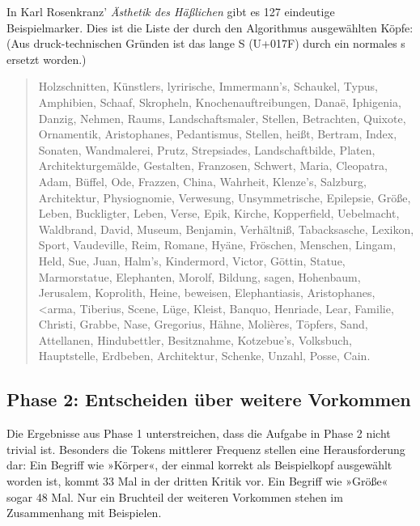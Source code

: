 \documentclass{article}
\newcommand*{\lit}{\textit}%
\begin{document}
In Karl Rosenkranz' \lit{Ästhetik des
  Häßlichen} \parencite{Rosenkranz1853a} gibt es 127 eindeutige
Beispielmarker. Dies ist die Liste der durch den Algorithmus
ausgewählten Köpfe: (Aus druck-technischen Gründen ist das lange S
(U+017F) durch ein normales s ersetzt worden.)

\begin{quote}
  Holzschnitten, Künstlers, lyrirische, Immermann's, Schaukel, Typus,
  Amphibien, Schaaf, Skropheln, Knochenauftreibungen, Danaë,
  Iphigenia, Danzig, Nehmen, Raums, Landschaftsmaler, Stellen,
  Betrachten, Quixote, Ornamentik, Aristophanes, Pedantismus, Stellen,
  heißt, Bertram, Index, Sonaten, Wandmalerei, Prutz, Strepsiades,
  Landschaftbilde, Platen, Architekturgemälde, Gestalten, Franzosen,
  Schwert, Maria, Cleopatra, Adam, Büffel, Ode, Frazzen, China,
  Wahrheit, Klenze's, Salzburg, Architektur, Physiognomie, Verwesung,
  Unsymmetrische, Epilepsie, Größe, Leben, Buckligter, Leben, Verse,
  Epik, Kirche, Kopperfield, Uebelmacht, Waldbrand, David, Museum,
  Benjamin, Verhältniß, Tabacksasche, Lexikon, Sport, Vaudeville,
  Reim, Romane, Hyäne, Fröschen, Menschen, Lingam, Held, Sue, Juan,
  Halm's, Kindermord, Victor, Göttin, Statue, Marmorstatue,
  Elephanten, Morolf, Bildung, sagen, Hohenbaum, Jerusalem, Koprolith,
  Heine, beweisen, Elephantiasis, Aristophanes,
  \foreignlanguage{polutonikogreek}{<arma}, %
  Tiberius, Scene, Lüge, Kleist, Banquo, Henriade, Lear, Familie,
  Christi, Grabbe, Nase, Gregorius, Hähne, Molières, Töpfers, Sand,
  Attellanen, Hindubettler, Besitznahme, Kotzebue's, Volksbuch,
  Hauptstelle, Erdbeben, Architektur, Schenke, Unzahl, Posse, Cain.
\end{quote}

\subsection{Phase 2: Entscheiden über weitere Vorkommen}

Die Ergebnisse aus Phase 1 unterstreichen, dass die Aufgabe in Phase 2
nicht trivial ist. Besonders die Tokens mittlerer Frequenz stellen
eine Herausforderung dar: Ein Begriff wie »Körper«, der einmal korrekt
als Beispielkopf ausgewählt worden ist, kommt 33 Mal in der dritten
Kritik vor. Ein Begriff wie »Größe« sogar 48 Mal. Nur ein Bruchteil
der weiteren Vorkommen stehen im Zusammenhang mit Beispielen.
\end{document}
